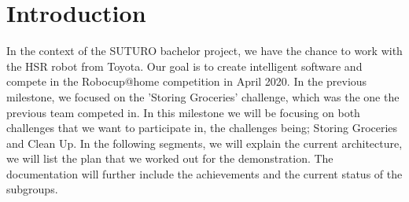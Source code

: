 \documentclass[main.tex]{subfiles}
\begin{document}
	\chapter{Introduction}
	In the context of the SUTURO bachelor project, we have the chance to work with the HSR robot from Toyota. Our goal is to create intelligent software and compete in the Robocup@home competition in April 2020. 
	In the previous milestone, we focused on the 'Storing Groceries' challenge, which was the one the previous team competed in. In this milestone we will be focusing on both challenges that we want to participate in, the challenges being; Storing Groceries and Clean Up. 
	In the following segments, we will explain the current architecture, we will list the plan that we worked out for the demonstration. The documentation will further include the achievements and the current status of the subgroups.
\end{document}
